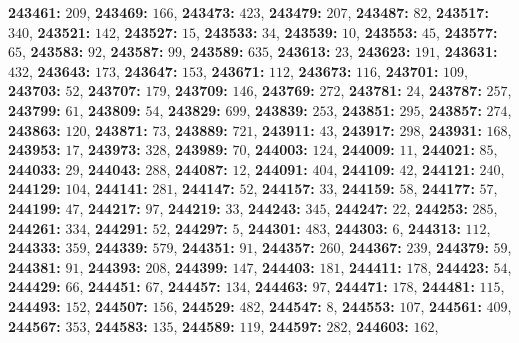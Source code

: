 \textsf{\bfseries 243461:} $209$, \textsf{\bfseries 243469:} $166$, \textsf{\bfseries 243473:} $423$, \textsf{\bfseries 243479:} $207$, \textsf{\bfseries 243487:} $82$, \textsf{\bfseries 243517:} $340$, \textsf{\bfseries 243521:} $142$, \textsf{\bfseries 243527:} $15$, \textsf{\bfseries 243533:} $34$, \textsf{\bfseries 243539:} $10$, \textsf{\bfseries 243553:} $45$, \textsf{\bfseries 243577:} $65$, \textsf{\bfseries 243583:} $92$, \textsf{\bfseries 243587:} $99$, \textsf{\bfseries 243589:} $635$, \textsf{\bfseries 243613:} $23$, \textsf{\bfseries 243623:} $191$, \textsf{\bfseries 243631:} $432$, \textsf{\bfseries 243643:} $173$, \textsf{\bfseries 243647:} $153$, \textsf{\bfseries 243671:} $112$, \textsf{\bfseries 243673:} $116$, \textsf{\bfseries 243701:} $109$, \textsf{\bfseries 243703:} $52$, \textsf{\bfseries 243707:} $179$, \textsf{\bfseries 243709:} $146$, \textsf{\bfseries 243769:} $272$, \textsf{\bfseries 243781:} $24$, \textsf{\bfseries 243787:} $257$, \textsf{\bfseries 243799:} $61$, \textsf{\bfseries 243809:} $54$, \textsf{\bfseries 243829:} $699$, \textsf{\bfseries 243839:} $253$, \textsf{\bfseries 243851:} $295$, \textsf{\bfseries 243857:} $274$, \textsf{\bfseries 243863:} $120$, \textsf{\bfseries 243871:} $73$, \textsf{\bfseries 243889:} $721$, \textsf{\bfseries 243911:} $43$, \textsf{\bfseries 243917:} $298$, \textsf{\bfseries 243931:} $168$, \textsf{\bfseries 243953:} $17$, \textsf{\bfseries 243973:} $328$, \textsf{\bfseries 243989:} $70$, \textsf{\bfseries 244003:} $124$, \textsf{\bfseries 244009:} $11$, \textsf{\bfseries 244021:} $85$, \textsf{\bfseries 244033:} $29$, \textsf{\bfseries 244043:} $288$, \textsf{\bfseries 244087:} $12$, \textsf{\bfseries 244091:} $404$, \textsf{\bfseries 244109:} $42$, \textsf{\bfseries 244121:} $240$, \textsf{\bfseries 244129:} $104$, \textsf{\bfseries 244141:} $281$, \textsf{\bfseries 244147:} $52$, \textsf{\bfseries 244157:} $33$, \textsf{\bfseries 244159:} $58$, \textsf{\bfseries 244177:} $57$, \textsf{\bfseries 244199:} $47$, \textsf{\bfseries 244217:} $97$, \textsf{\bfseries 244219:} $33$, \textsf{\bfseries 244243:} $345$, \textsf{\bfseries 244247:} $22$, \textsf{\bfseries 244253:} $285$, \textsf{\bfseries 244261:} $334$, \textsf{\bfseries 244291:} $52$, \textsf{\bfseries 244297:} $5$, \textsf{\bfseries 244301:} $483$, \textsf{\bfseries 244303:} $6$, \textsf{\bfseries 244313:} $112$, \textsf{\bfseries 244333:} $359$, \textsf{\bfseries 244339:} $579$, \textsf{\bfseries 244351:} $91$, \textsf{\bfseries 244357:} $260$, \textsf{\bfseries 244367:} $239$, \textsf{\bfseries 244379:} $59$, \textsf{\bfseries 244381:} $91$, \textsf{\bfseries 244393:} $208$, \textsf{\bfseries 244399:} $147$, \textsf{\bfseries 244403:} $181$, \textsf{\bfseries 244411:} $178$, \textsf{\bfseries 244423:} $54$, \textsf{\bfseries 244429:} $66$, \textsf{\bfseries 244451:} $67$, \textsf{\bfseries 244457:} $134$, \textsf{\bfseries 244463:} $97$, \textsf{\bfseries 244471:} $178$, \textsf{\bfseries 244481:} $115$, \textsf{\bfseries 244493:} $152$, \textsf{\bfseries 244507:} $156$, \textsf{\bfseries 244529:} $482$, \textsf{\bfseries 244547:} $8$, \textsf{\bfseries 244553:} $107$, \textsf{\bfseries 244561:} $409$, \textsf{\bfseries 244567:} $353$, \textsf{\bfseries 244583:} $135$, \textsf{\bfseries 244589:} $119$, \textsf{\bfseries 244597:} $282$, \textsf{\bfseries 244603:} $162$, 
